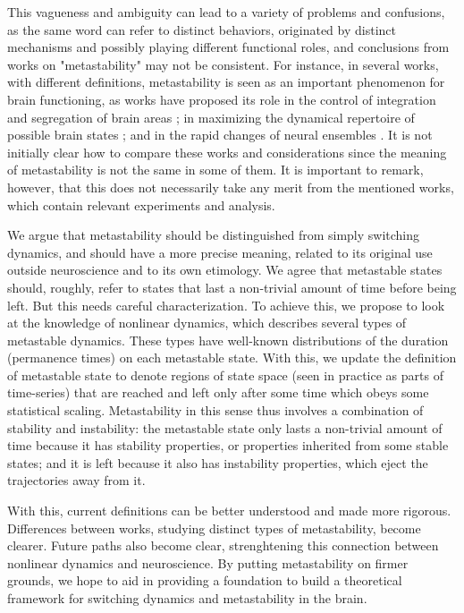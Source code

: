 \documentclass[preprint,superscriptaddress,showpacs,amsmath,amssymb,aps,pre,floatfix]{revtex4-1}
\theoremstyle{definition}
\begin{document}
This vagueness and ambiguity can lead to a variety of problems and confusions, as the same word can refer to distinct behaviors, originated by distinct mechanisms and possibly playing different functional roles, and conclusions from works on "metastability" may not be consistent. 
For instance, in several works, with different definitions, metastability is seen as an important phenomenon for brain functioning, as works have proposed its role in the control of integration and segregation of brain areas \cite{tognoli_2014, fingelkurts_2004, alderson_2018}; in maximizing the dynamical repertoire of possible brain states \cite{ponce-alvarez_2015, alderson_2020, hellyer_2014, cordova-palomera_2017}; and in the rapid changes of neural ensembles \cite{shanahan_2010, kahana_2006}. It is not initially clear how to compare these works and considerations since the meaning of metastability is not the same in some of them. It is important to remark, however, that this does not necessarily take any merit from the mentioned works, which contain relevant experiments and analysis. 

We argue that metastability should be distinguished from simply switching dynamics, and should have a more precise meaning, related to its original use outside neuroscience and to its own etimology. We agree that metastable states should, roughly, refer to states that last a non-trivial amount of time before being left. But this needs careful characterization. To achieve this, we propose to look at the knowledge of nonlinear dynamics, which describes several types of metastable dynamics. These types have well-known distributions of the duration (permanence times) on each metastable state. With this, we update the definition of metastable state to denote regions of state space (seen in practice as parts of time-series) that are reached and left only after some time which obeys some statistical scaling.
Metastability in this sense thus involves a combination of stability and instability: the metastable state only lasts a non-trivial amount of time because it has stability properties, or properties inherited from some stable states; and it is left because it also has instability properties, which eject the trajectories away from it. 

With this, current definitions can be better understood and made more rigorous. Differences between works, studying distinct types of metastability, become clearer. Future paths also become clear, strenghtening this connection between nonlinear dynamics and neuroscience. By putting metastability on firmer grounds, we hope to aid in providing a foundation to build a theoretical framework for switching dynamics and metastability in the brain. 
\end{document}

